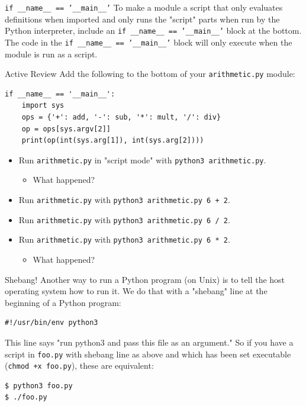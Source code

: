 \documentclass[smaller, aspectratio=1610]{beamer}
\begin{document}
\begin{frame}[label={sec:orgb758fc1},fragile]{\texttt{if \_\_name\_\_ == '\_\_main\_\_'}}
 To make a module a script that only evaluates definitions when imported and only runs the "script" parts when run by the Python interpreter, include an \texttt{if \_\_name\_\_ == '\_\_main\_\_'} block at the bottom.  The code in the \texttt{if \_\_name\_\_ == '\_\_main\_\_'} block will only execute when the module is run as a script.

\begin{block}{Active Review}
Add the following to the bottom of your \texttt{arithmetic.py} module:

\lstset{language=Python,label= ,caption= ,captionpos=b,numbers=none}
\begin{lstlisting}
if __name__ == '__main__':
    import sys
    ops = {'+': add, '-': sub, '*': mult, '/': div}
    op = ops[sys.argv[2]]
    print(op(int(sys.arg[1]), int(sys.arg[2])))
\end{lstlisting}

\begin{itemize}
\item Run \texttt{arithmetic.py} in "script mode" with \texttt{python3 arithmetic.py}.
\begin{itemize}
\item What happened?
\end{itemize}
\item Run \texttt{arithmetic.py} with \texttt{python3 arithmetic.py 6 + 2}.
\item Run \texttt{arithmetic.py} with \texttt{python3 arithmetic.py 6 / 2}.
\item Run \texttt{arithmetic.py} with \texttt{python3 arithmetic.py 6 * 2}.
\begin{itemize}
\item What happened?
\end{itemize}
\end{itemize}
\end{block}
\end{frame}

\begin{frame}[label={sec:org72ef44f},fragile]{Shebang!}
 Another way to run a Python program (on Unix) is to tell the host operating system how to run it. We do that with a "shebang" line at the beginning of a Python program:

\lstset{language=Python,label= ,caption= ,captionpos=b,numbers=none}
\begin{lstlisting}
#!/usr/bin/env python3
\end{lstlisting}

This line says "run python3 and pass this file as an argument." So if you have a script in \texttt{foo.py} with shebang line as above and which has been set executable (\texttt{chmod +x foo.py}), these are equivalent:

\lstset{language=Python,label= ,caption= ,captionpos=b,numbers=none}
\begin{lstlisting}
$ python3 foo.py
$ ./foo.py
\end{lstlisting}
\end{frame}
\end{document}
